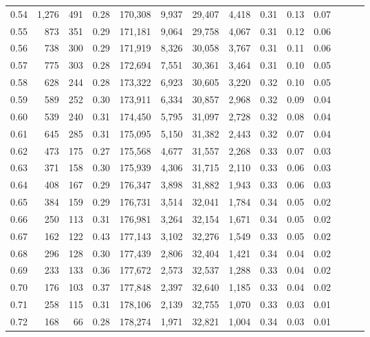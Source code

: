 \begin{tabular}{rrrrrrrrrrrrrr}
0.54 &  1,276 &  491 &  0.28 &  170,308 &    9,937 &  29,407 &   4,418 &  0.31 &  0.13 &      0.07 \\
0.55 &    873 &  351 &  0.29 &  171,181 &    9,064 &  29,758 &   4,067 &  0.31 &  0.12 &      0.06 \\
0.56 &    738 &  300 &  0.29 &  171,919 &    8,326 &  30,058 &   3,767 &  0.31 &  0.11 &      0.06 \\
0.57 &    775 &  303 &  0.28 &  172,694 &    7,551 &  30,361 &   3,464 &  0.31 &  0.10 &      0.05 \\
0.58 &    628 &  244 &  0.28 &  173,322 &    6,923 &  30,605 &   3,220 &  0.32 &  0.10 &      0.05 \\
0.59 &    589 &  252 &  0.30 &  173,911 &    6,334 &  30,857 &   2,968 &  0.32 &  0.09 &      0.04 \\
0.60 &    539 &  240 &  0.31 &  174,450 &    5,795 &  31,097 &   2,728 &  0.32 &  0.08 &      0.04 \\
0.61 &    645 &  285 &  0.31 &  175,095 &    5,150 &  31,382 &   2,443 &  0.32 &  0.07 &      0.04 \\
0.62 &    473 &  175 &  0.27 &  175,568 &    4,677 &  31,557 &   2,268 &  0.33 &  0.07 &      0.03 \\
0.63 &    371 &  158 &  0.30 &  175,939 &    4,306 &  31,715 &   2,110 &  0.33 &  0.06 &      0.03 \\
0.64 &    408 &  167 &  0.29 &  176,347 &    3,898 &  31,882 &   1,943 &  0.33 &  0.06 &      0.03 \\
0.65 &    384 &  159 &  0.29 &  176,731 &    3,514 &  32,041 &   1,784 &  0.34 &  0.05 &      0.02 \\
0.66 &    250 &  113 &  0.31 &  176,981 &    3,264 &  32,154 &   1,671 &  0.34 &  0.05 &      0.02 \\
0.67 &    162 &  122 &  0.43 &  177,143 &    3,102 &  32,276 &   1,549 &  0.33 &  0.05 &      0.02 \\
0.68 &    296 &  128 &  0.30 &  177,439 &    2,806 &  32,404 &   1,421 &  0.34 &  0.04 &      0.02 \\
0.69 &    233 &  133 &  0.36 &  177,672 &    2,573 &  32,537 &   1,288 &  0.33 &  0.04 &      0.02 \\
0.70 &    176 &  103 &  0.37 &  177,848 &    2,397 &  32,640 &   1,185 &  0.33 &  0.04 &      0.02 \\
0.71 &    258 &  115 &  0.31 &  178,106 &    2,139 &  32,755 &   1,070 &  0.33 &  0.03 &      0.01 \\
0.72 &    168 &   66 &  0.28 &  178,274 &    1,971 &  32,821 &   1,004 &  0.34 &  0.03 &      0.01 \\

\end{tabular}
